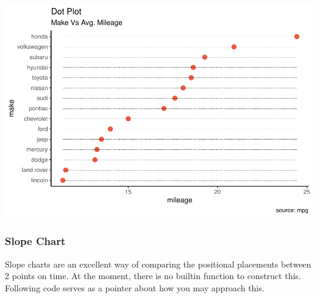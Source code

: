 \documentclass[a4paper]{article}
\begin{document}
\includegraphics{M24-ggplot2_Gallery_files/figure-latex/unnamed-chunk-19-1.pdf}
\newpage

\subsubsection{Slope Chart}\label{slope-chart}

Slope charts are an excellent way of comparing the positional placements
between 2 points on time. At the moment, there is no builtin function to
construct this. Following code serves as a pointer about how you may
approach this.
\end{document}
